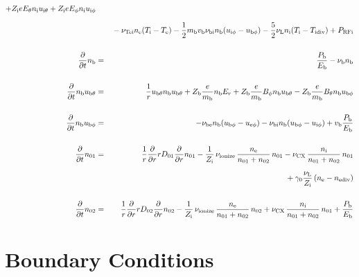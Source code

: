 \documentclass[11pt]{article}
\def\r#1{{\rm#1}}
\def\ddt{\frac{\partial}{\partial t}}
\def\ddr{\frac{\partial}{\partial r}}
\def\mb{m_\r{b}}
\def\ne{n_\r{e}}
\def\ni{n_\r{i}}
\def\nb{n_\r{b}}
\def\uith{u_{\r{i}\theta}}
\def\ubth{u_{\r{b}\theta}}
\def\ueph{u_{\r{e}\phi}}
\def\uiph{u_{\r{i}\phi}}
\def\ubph{u_{\r{b}\phi}}
\def\Er{E_r}
\def\Eth{E_\theta}
\def\Eph{E_\phi}
\def\Bth{B_\theta}
\def\Bph{B_\phi}
\def\Te{T_\r{e}}
\def\Ti{T_\r{i}}
\def\nna{n_{01}}
\def\nnb{n_{02}}
\def\Zi{Z_\r{i}}
\def\Zb{Z_\r{b}}
\def\Pb{P_\r{b}}
\def\Eb{E_\r{b}}
\def\PRFi{P_\r{RFi}}
\def\nube{\nu_\r{be}}
\def\nubi{\nu_\r{bi}}
\def\nuL{\nu_\r{L}}
\def\nuCX{\nu_\r{CX}}
\def\nuion{\nu_\r{ionize}}
\def\nub{\nu_\r{b}}
\def\nuTei{\nu_\r{Tei}}
\def\vb{v_\r{b}}
\def\nediv{n_\r{ediv}}
\def\Tidiv{T_\r{idiv}}
\begin{document}
\begin{eqnarray}
%
  + \Zi e \Eth \ni \uith
%
  + \Zi e \Eph \ni \uiph
\nonumber\\[2.5mm]&&{}
%
  - \nuTei \ne (\Ti - \Te)
%
  - \frac{1}{2} \mb \vb \nubi \nb (\uiph - \ubph)
%
  - \frac{5}{2} \nuL \ni (\Ti - \Tidiv)
%
  + \PRFi
\\[5mm]
%
%
  \ddt \nb &=&
%
    \frac{\Pb}{\Eb}
%
  - \nub \nb
\\[5mm]
%
%
  \ddt \nb \ubth &=&
%
    \frac{1}{r} \ubth \nb \ubth
%
  + \Zb \frac{e}{\mb} \nb \Er 
%
  + \Zb \frac{e}{\mb} \Bph \nb \ubth
%
  - \Zb \frac{e}{\mb} \Bth \nb \ubph
\\[5mm]
%
%
  \ddt \nb \ubph &=&
%
  - \nube \nb (\ubph - \ueph)
%
  - \nubi \nb (\ubph - \uiph)
%
  + \vb \frac{\Pb}{\Eb}
\\[5mm]
%
%
  \ddt \nna &=& 
%
    \frac{1}{r} \ddr r D_{01} \ddr \nna
%
  - \frac{1}{\Zi}\, \nuion\, \frac{\ne}{\nna+\nnb}\, \nna
%
  - \nuCX\, \frac{\ni}{\nna+\nnb}\, \nna
\nonumber\\[2.5mm]&&{}
%
  + \gamma_0 \frac{\nuL}{\Zi} \, (\ne - \nediv)
\\[5mm]
%
%
  \ddt \nnb &=& 
%
    \frac{1}{r} \ddr r D_{02} \ddr \nnb
%
  - \frac{1}{\Zi}\, \nuion\, \frac{\ne}{\nna+\nnb}\, \nnb
%
  + \nuCX\, \frac{\ni}{\nna+\nnb}\, \nna
%
  + \frac{\Pb}{\Eb}
\end{eqnarray}

\bigskip

\section{Boundary Conditions}
\end{document}
